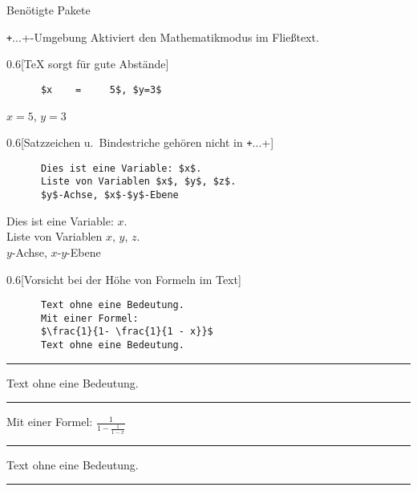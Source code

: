 \begin{frame}[fragile,t]{
  Benötigte Pakete
  \hfill
}

  \vspace{5pt}
\end{frame}

\begin{frame}[fragile]{\texttt+$...$+-Umgebung}
  Aktiviert den Mathematikmodus im Fließtext.

  \begin{CodeExample}{0.6}[\TeX{} sorgt für gute Abstände]
    \begin{verbatim}
      $x    =     5$, $y=3$
    \end{verbatim}
  \CodeResult
    \strut
    $x    =     5$, $y=3$
  \end{CodeExample}

  \begin{CodeExample}{0.6}[Satzzeichen u.\ Bindestriche gehören nicht in \texttt+$...$+]
    \begin{verbatim}
      Dies ist eine Variable: $x$.
      Liste von Variablen $x$, $y$, $z$.
      $y$-Achse, $x$-$y$-Ebene
    \end{verbatim}
  \CodeResult
    \strut
    Dies ist eine Variable: $x$. \\
    Liste von Variablen $x$, $y$, $z$. \\
    $y$-Achse, $x$-$y$-Ebene
  \end{CodeExample}
  \begin{CodeExample}{0.6}[Vorsicht bei der Höhe von Formeln im Text]
    \begin{verbatim}
      Text ohne eine Bedeutung.
      Mit einer Formel:
      $\frac{1}{1- \frac{1}{1 - x}}$
      Text ohne eine Bedeutung.
    \end{verbatim}
  \CodeResult
    \hrule
    Text ohne eine Bedeutung.
    \hrule
    Mit einer Formel: $\frac{1}{1- \frac{1}{1 - x}}$
    \hrule
    Text ohne eine Bedeutung.
    \hrule
  \end{CodeExample}
\end{frame}


